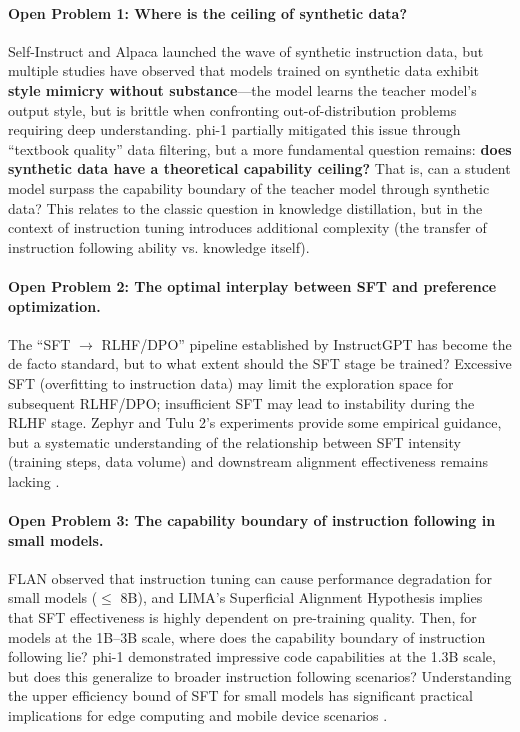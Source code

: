 \begin{openproblembox}
\paragraph{Open Problem 1: Where is the ceiling of synthetic data?}
Self-Instruct and Alpaca launched the wave of synthetic instruction data,
but multiple studies have observed that models trained on synthetic data exhibit \textbf{style mimicry without substance}---the
model learns the teacher model's output style, but is brittle when confronting out-of-distribution problems requiring deep understanding.
phi-1 partially mitigated this issue through ``textbook quality'' data filtering,
but a more fundamental question remains: \textbf{does synthetic data have a theoretical capability ceiling?}
That is, can a student model surpass the capability boundary of the teacher model through synthetic data?
This relates to the classic question in knowledge distillation, but in the context of instruction tuning
introduces additional complexity (the transfer of instruction following ability vs. knowledge itself).
\end{openproblembox}

\begin{openproblembox}
\paragraph{Open Problem 2: The optimal interplay between SFT and preference optimization.}
The ``SFT $\rightarrow$ RLHF/DPO'' pipeline established by InstructGPT has become the de facto standard,
but to what extent should the SFT stage be trained?
Excessive SFT (overfitting to instruction data) may limit the exploration space for subsequent RLHF/DPO;
insufficient SFT may lead to instability during the RLHF stage.
Zephyr and Tulu 2's experiments provide some empirical guidance,
but a systematic understanding of the relationship between SFT intensity (training steps, data volume) and downstream alignment effectiveness remains lacking
.
\end{openproblembox}

\begin{openproblembox}
\paragraph{Open Problem 3: The capability boundary of instruction following in small models.}
FLAN observed that instruction tuning can cause performance degradation for small models ($\leq$ 8B),
and LIMA's Superficial Alignment Hypothesis implies that SFT effectiveness is highly dependent on pre-training quality.
Then, for models at the 1B--3B scale, where does the capability boundary of instruction following lie?
phi-1 demonstrated impressive code capabilities at the 1.3B scale,
but does this generalize to broader instruction following scenarios?
Understanding the upper efficiency bound of SFT for small models has significant practical implications for edge computing and mobile device scenarios
.
\end{openproblembox}

